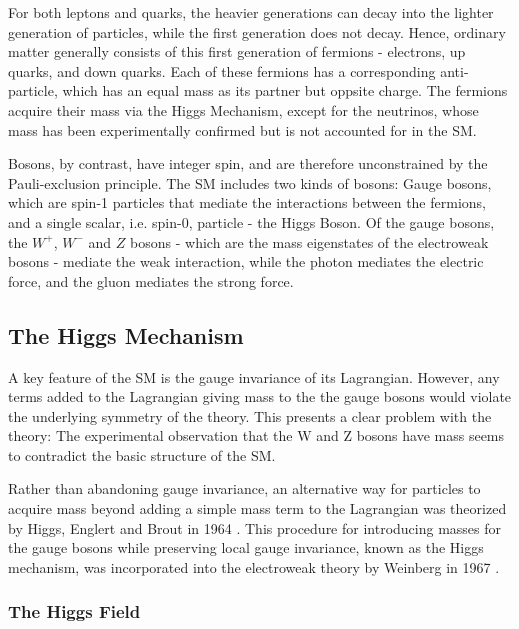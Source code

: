 For both leptons and quarks, the heavier generations can decay into the lighter generation of particles, while the first generation does not decay. Hence, ordinary matter generally consists of this first generation of fermions - electrons, up quarks, and down quarks. Each of these fermions has a corresponding anti-particle, which has an equal mass as its partner but oppsite charge. The fermions acquire their mass via the Higgs Mechanism, except for the neutrinos, whose mass has been experimentally confirmed but is not accounted for in the SM. 

Bosons, by contrast, have integer spin, and are therefore unconstrained by the Pauli-exclusion principle. The SM includes two kinds of bosons: Gauge bosons, which are spin-1 particles that mediate the interactions between the fermions, and a single scalar, i.e. spin-0, particle - the Higgs Boson. Of the gauge bosons, the $W^+$, $W^-$ and $Z$ bosons - which are the mass eigenstates of the electroweak bosons - mediate the weak interaction, while the photon mediates the electric force, and the gluon mediates the strong force. 


\subsection{The Higgs Mechanism}
\label{sec:higgsMech}

A key feature of the SM is the gauge invariance of its Lagrangian. However, any terms added to the Lagrangian giving mass to the the gauge bosons would violate the underlying symmetry of the theory. This presents a clear problem with the theory: The experimental observation that the W and Z bosons have mass seems to contradict the basic structure of the SM. 

Rather than abandoning gauge invariance, an alternative way for particles to acquire mass beyond adding a simple mass term to the Lagrangian was theorized by Higgs, Englert and Brout in 1964 \cite{Higgs}. This procedure for introducing masses for the gauge bosons while preserving local gauge invariance, known as the Higgs mechanism, was incorporated into the electroweak theory by Weinberg in 1967 \cite{PhysRev.127.965}.  

\subsubsection{The Higgs Field}
\label{sec:higgsField}

